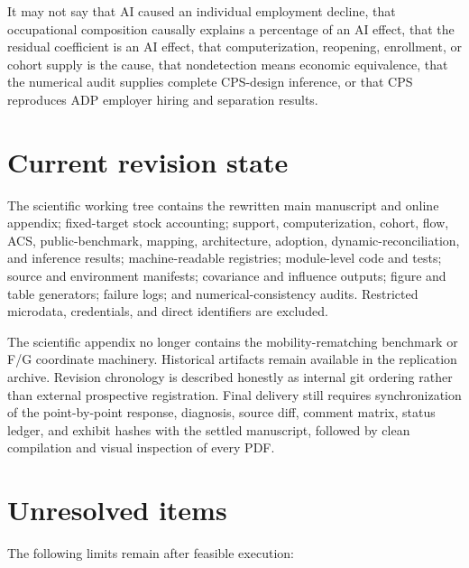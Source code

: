 \documentclass[11pt,letterpaper]{article}
\begin{document}
It may not say that AI caused an individual employment decline, that occupational composition causally explains a percentage of an AI effect, that the residual coefficient is an AI effect, that computerization, reopening, enrollment, or cohort supply is the cause, that nondetection means economic equivalence, that the numerical audit supplies complete CPS-design inference, or that CPS reproduces ADP employer hiring and separation results.

\section*{Current revision state}

The scientific working tree contains the rewritten main manuscript and online appendix; fixed-target stock accounting; support, computerization, cohort, flow, ACS, public-benchmark, mapping, architecture, adoption, dynamic-reconciliation, and inference results; machine-readable registries; module-level code and tests; source and environment manifests; covariance and influence outputs; figure and table generators; failure logs; and numerical-consistency audits.  Restricted microdata, credentials, and direct identifiers are excluded.

The scientific appendix no longer contains the mobility-rematching benchmark or F/G coordinate machinery.  Historical artifacts remain available in the replication archive.  Revision chronology is described honestly as internal git ordering rather than external prospective registration.  Final delivery still requires synchronization of the point-by-point response, diagnosis, source diff, comment matrix, status ledger, and exhibit hashes with the settled manuscript, followed by clean compilation and visual inspection of every PDF.

\section*{Unresolved items}

The following limits remain after feasible execution:
\end{document}
